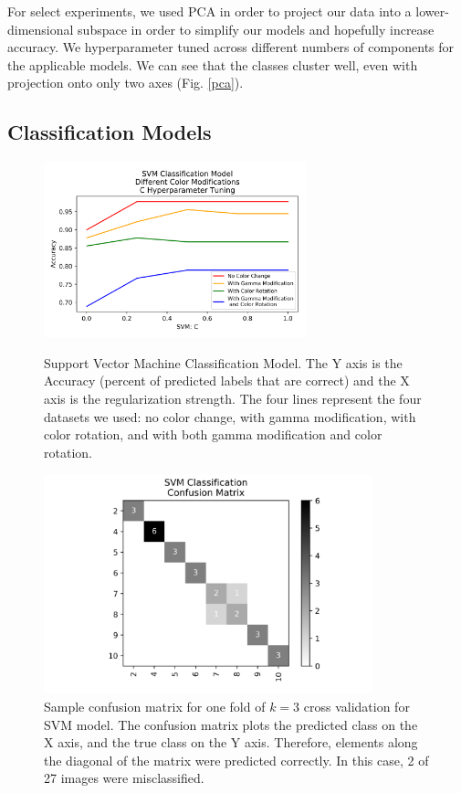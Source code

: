 \documentclass[journal]{IEEEtran}
\begin{document}
For select experiments, we used PCA in order to project our data into a lower-dimensional subspace in order to simplify our models and hopefully increase accuracy. We hyperparameter tuned across different numbers of components for the applicable models. We can see that the classes cluster well, even with projection onto only two axes (Fig. \ref{pca}).

\subsection{Classification Models}

\begin{figure}
\centering
\includegraphics[height=2in]{SVM/svm_classification.png}
\caption{Support Vector Machine Classification Model. The Y axis is the Accuracy (percent of predicted labels that are correct) and the X axis is the regularization strength. The four lines represent the four datasets we used: no color change, with gamma modification, with color rotation, and with both gamma modification and color rotation.}
\label{svm}

\centering
\includegraphics[height=2.5in]{SVM/SVM_classification_cfm.png}
\caption{Sample confusion matrix for one fold of $k=3$ cross validation for SVM model. The confusion matrix plots the predicted class on the X axis, and the true class on the Y axis. Therefore, elements along the diagonal of the matrix were predicted correctly. In this case, 2 of 27 images were misclassified.}
\label{svm_confusion}
\end{figure}
\end{document}
